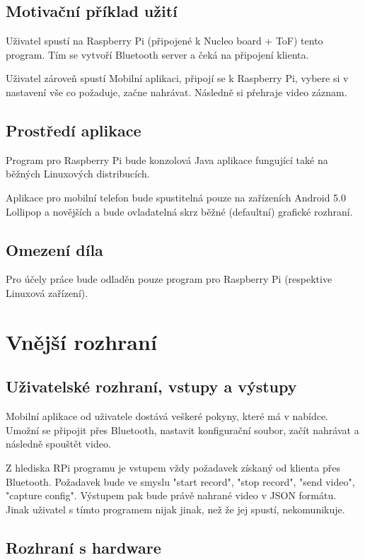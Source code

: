 \documentclass[12pt,a4paper]{article}
\begin{document}
\subsection{Motivační příklad užití}

Uživatel spustí na Raspberry Pi (připojené k Nucleo board + ToF) tento program.
Tím se vytvoří Bluetooth server a čeká na připojení klienta.

Uživatel zároveň spustí Mobilní aplikaci, připojí se k Raspberry Pi, vybere si v nastavení vše co požaduje, začne nahrávat.
Následně si přehraje video záznam.

\subsection{Prostředí aplikace}
	Program pro Raspberry Pi bude konzolová Java aplikace fungující také na běžných Linuxových distribucích.
	
	Aplikace pro mobilní telefon bude spustitelná pouze na zařízeních Android 5.0 Lollipop a novějších a bude ovladatelná skrz běžné (defaultní) grafické rozhraní.
\subsection{Omezení díla}

Pro účely práce bude odladěn pouze program pro Raspberry Pi (respektive Linuxová zařízení).

\section{Vnější rozhraní}

\subsection{Uživatelské rozhraní, vstupy a výstupy}
Mobilní aplikace od uživatele dostává veškeré pokyny, které má v nabídce. Umožní se připojit přes Bluetooth, nastavit konfigurační soubor, začít nahrávat a následně spouštět video.


Z hlediska RPi programu je vstupem vždy požadavek získaný od klienta přes Bluetooth.
Požadavek bude ve smyslu "start record", "stop record", "send video", "capture config".
Výstupem pak bude právě nahrané video v JSON formátu. 
Jinak uživatel s tímto programem nijak jinak, než že jej spustí, nekomunikuje.


\subsection{Rozhraní s hardware}
\end{document}
